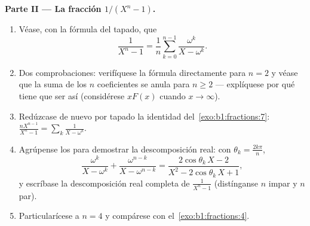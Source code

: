 \begin{problem}
\medskip
\noindent\textbf{Parte II --- La fracción $1/(X^n - 1)$.}
\begin{enumerate}[resume]
  \item Véase, con la fórmula del tapado, que
        \[
        \frac{1}{X^n - 1}
        = \frac1n\sum_{k=0}^{n-1}\frac{\omega^k}{X - \omega^k} .
        \]
  \item Dos comprobaciones: verifíquese la fórmula directamente para
        $n = 2$ y véase que la suma de los $n$ coeficientes se anula
        para $n \geq 2$ --- explíquese por qué tiene que ser así
        (considérese $xF(x)$ cuando $x \to \infty$).
  \item Redúzcase de nuevo por tapado la identidad
        del~\cref{exo:b1:fractions:7}:
        $\frac{nX^{n-1}}{X^n-1} = \sum_k \frac1{X - \omega^k}$.
  \item Agrúpense los   para demostrar la
        descomposición real: con $\theta_k = \frac{2k\pi}n$,
        \[
        \frac{\omega^k}{X - \omega^k} +
        \frac{\omega^{n-k}}{X - \omega^{n-k}}
        = \frac{2\cos\theta_k\,X - 2}
        {X^2 - 2\cos\theta_k\,X + 1} ,
        \]
        y escríbase la descomposición real completa de
        $\frac1{X^n-1}$ (distínganse $n$ impar y $n$ par).
  \item Particularícese a $n = 4$ y compárese con
        el~\cref{exo:b1:fractions:4}.
\end{enumerate}


\end{problem}
